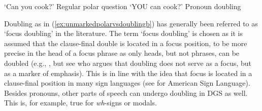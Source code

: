 \vspace{-0.2cm}

\begin{exe}
\ex\label{unmarkedpolarvsdoubling}\begin{xlist}
\ex {}
\glt `Can you cook?' \label{ex:unmarkedpolarvsdoublinga}\hfill Regular polar question
\ex {} 
%
%
\glt `YOU can cook?' \label{ex:unmarkedpolarvsdoublingb}\hfill Pronoun doubling

\end{xlist}
\end{exe}

\vspace{-0.2cm}

\noindent Doubling as in (\ref{ex:unmarkedpolarvsdoublingb}) has generally been referred to as `focus doubling' in the literature. The term `focus doubling' is chosen as it is assumed that the clause-final double is located in a focus position, to be more precise in the head of a focus phrase as only heads, but not phrases, can be doubled (e.g., \citealt{de1999phrase, sandler2006sign}, but see \citealt{wilbur2012informationstructure} who argues that doubling does not serve as a focus, but as a marker of emphasis). This is in line with the idea that focus is located in a clause-final position in many sign languages (see \citealt{wilbur1991intonation, wilbur1994foregrounding, wilbur1996evidence, wilbur1997prosodic} for American Sign Language). Besides pronouns, other parts of speech can undergo doubling in DGS as well. This is, for example, true for \textit{wh}-signs or modals. 

